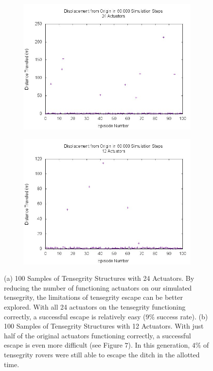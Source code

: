 \begin{figure}
\centering
\begin{subfigure}{.5\textwidth}
  \centering
  \includegraphics[width=\linewidth]{tex/ARMS_2015/Pictures/dists100.jpg}
  \caption{}
  \label{robust24scatter}
\end{subfigure}%
\begin{subfigure}{.5\textwidth}
  \centering
  \includegraphics[width=\linewidth]{tex/ARMS_2015/Pictures/dists50.jpg}
  \caption{}
  \label{robust12scatter}
\end{subfigure}
\caption{(a) 100 Samples of Tensegrity Structures with 24 Actuators. By reducing the number of functioning actuators on our simulated tensegrity, the limitations of tensegrity escape can be better explored. With all 24 actuators on the tensegrity functioning correctly, a successful escape is relatively easy ($9\%$ success rate). (b) 100 Samples of Tensegrity Structures with 12 Actuators. With just half of the original actuators functioning correctly, a successful escape is even more difficult (see Figure $7$).
In this generation, $4\%$ of tensegrity rovers were still able to escape the ditch in the allotted time.}
\label{fig:robustScatter}
\end{figure}

